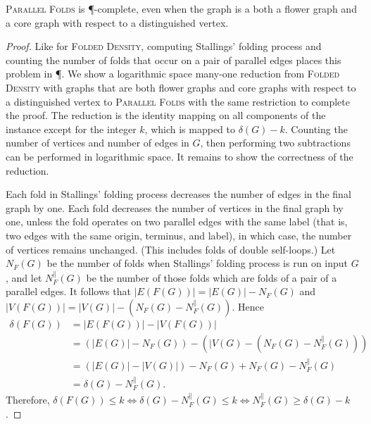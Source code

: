 \documentclass{article}
\newcommand{\FD}{\textsc{Folded Density}}
\newcommand{\PFolds}{\textsc{Parallel Folds}}
\begin{document}
\begin{theorem}
  \PFolds{} is \P-complete, even when the graph is a both a flower graph and a core graph with respect to a distinguished vertex.
\end{theorem}
\begin{proof}
  Like for \FD, computing Stallings' folding process and counting the number of folds that occur on a pair of parallel edges places this problem in \P.
  We show a logarithmic space many-one reduction from \FD{} with graphs that are both flower graphs and core graphs with respect to a distinguished vertex to \PFolds{} with the same restriction to complete the proof.
  The reduction is the identity mapping on all components of the instance except for the integer $k$, which is mapped to $\delta(G) - k$.
  Counting the number of vertices and number of edges in $G$, then performing two subtractions can be performed in logarithmic space.
  It remains to show the correctness of the reduction.

  Each fold in Stallings' folding process decreases the number of edges in the final graph by one.
  Each fold decreases the number of vertices in the final graph by one, unless the fold operates on two parallel edges with the same label (that is, two edges with the same origin, terminus, and label), in which case, the number of vertices remains unchanged.
  (This includes folds of double self-loops.)
  Let $N_F(G)$ be the number of folds when Stallings' folding process is run on input $G$, and let $N^\|_F(G)$ be the number of those folds which are folds of a pair of a parallel edges.
  It follows that $|E(F(G))| = |E(G)| - N_F(G)$ and $|V(F(G))| = |V(G)| - (N_F(G) - N^\|_F(G))$.
  Hence
  \begin{align*}
    \delta(F(G)) & = |E(F(G))| - |V(F(G))| \\
                 & = (|E(G)| - N_F(G)) - (|V(G) - (N_F(G) - N^\|_F(G))) \\
                 & = (|E(G)| - |V(G)|) - N_F(G) + N_F(G) - N^\|_F(G) \\
                 & = \delta(G) - N^\|_F(G).
  \end{align*}
  Therefore, $\delta(F(G)) \leq k \iff \delta(G) - N^\|_F(G) \leq k \iff N^\|_F(G) \geq \delta(G) - k$.
\end{proof}




\end{document}
